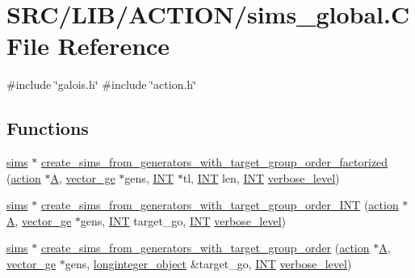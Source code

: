 \hypertarget{sims__global_8_c}{}\section{S\+R\+C/\+L\+I\+B/\+A\+C\+T\+I\+O\+N/sims\+\_\+global.C File Reference}
\label{sims__global_8_c}
{\ttfamily \#include \char`\"{}galois.\+h\char`\"{}}\newline
{\ttfamily \#include \char`\"{}action.\+h\char`\"{}}\newline
\subsection*{Functions}
\begin{DoxyCompactItemize}
\item 
\mbox{\hyperlink{classsims}{sims}} $\ast$ \mbox{\hyperlink{sims__global_8_c_a40f2df36e351d6e63bd2bb196cc5b430}{create\+\_\+sims\+\_\+from\+\_\+generators\+\_\+with\+\_\+target\+\_\+group\+\_\+order\+\_\+factorized}} (\mbox{\hyperlink{classaction}{action}} $\ast$\mbox{\hyperlink{simeon_8_c_a97833f04c3a9c008df5521a2fc291bb4}{A}}, \mbox{\hyperlink{classvector__ge}{vector\+\_\+ge}} $\ast$gens, \mbox{\hyperlink{galois_8h_a09fddde158a3a20bd2dcadb609de11dc}{I\+NT}} $\ast$tl, \mbox{\hyperlink{galois_8h_a09fddde158a3a20bd2dcadb609de11dc}{I\+NT}} len, \mbox{\hyperlink{galois_8h_a09fddde158a3a20bd2dcadb609de11dc}{I\+NT}} \mbox{\hyperlink{simeon_8_c_a818073fbcc2f439e7c56952f67386122}{verbose\+\_\+level}})
\item 
\mbox{\hyperlink{classsims}{sims}} $\ast$ \mbox{\hyperlink{sims__global_8_c_a4e7d0b5c218eb15f66a0714069168efb}{create\+\_\+sims\+\_\+from\+\_\+generators\+\_\+with\+\_\+target\+\_\+group\+\_\+order\+\_\+\+I\+NT}} (\mbox{\hyperlink{classaction}{action}} $\ast$\mbox{\hyperlink{simeon_8_c_a97833f04c3a9c008df5521a2fc291bb4}{A}}, \mbox{\hyperlink{classvector__ge}{vector\+\_\+ge}} $\ast$gens, \mbox{\hyperlink{galois_8h_a09fddde158a3a20bd2dcadb609de11dc}{I\+NT}} target\+\_\+go, \mbox{\hyperlink{galois_8h_a09fddde158a3a20bd2dcadb609de11dc}{I\+NT}} \mbox{\hyperlink{simeon_8_c_a818073fbcc2f439e7c56952f67386122}{verbose\+\_\+level}})
\item 
\mbox{\hyperlink{classsims}{sims}} $\ast$ \mbox{\hyperlink{sims__global_8_c_ad6f0d6c8d1993d509920e0e16dbfb2f2}{create\+\_\+sims\+\_\+from\+\_\+generators\+\_\+with\+\_\+target\+\_\+group\+\_\+order}} (\mbox{\hyperlink{classaction}{action}} $\ast$\mbox{\hyperlink{simeon_8_c_a97833f04c3a9c008df5521a2fc291bb4}{A}}, \mbox{\hyperlink{classvector__ge}{vector\+\_\+ge}} $\ast$gens, \mbox{\hyperlink{classlonginteger__object}{longinteger\+\_\+object}} \&target\+\_\+go, \mbox{\hyperlink{galois_8h_a09fddde158a3a20bd2dcadb609de11dc}{I\+NT}} \mbox{\hyperlink{simeon_8_c_a818073fbcc2f439e7c56952f67386122}{verbose\+\_\+level}})

\end{DoxyCompactItemize}
